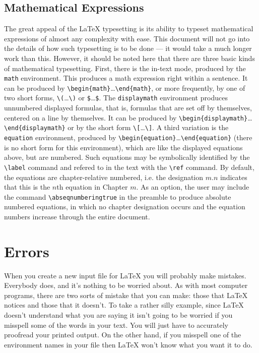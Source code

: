 \section{Mathematical Expressions}
The great appeal of the \LaTeX{} typesetting is its ability to
typeset mathematical expressions of almost any complexity with
ease.  This document will not go into the details of how such
typesetting is to be done --- it would take a much longer work
than this.  However, it should be noted here that there are
three basic kinds of mathematical typesetting.
First, there is the in-text mode, produced by the \verb+math+
environment.  This produces a math expression right within a
sentence.  It can be produced by
\verb+\begin{math}+\ldots\verb+\end{math}+, or more frequently,
by one of two short forms, \verb+\(+\ldots\verb+\)+ or
\verb+$+\ldots\verb+$+.
The \verb+displaymath+ environment produces unnumbered displayed
formulas, that is, formulas that are set off by themselves,
centered on a line by themselves.  It can be produced by
\verb+\begin{displaymath}+\ldots\verb+\end{displaymath}+ or by the
short form \verb+\[+\ldots\verb+\]+.
A third variation is the \verb+equation+ environment, produced
by \verb+\begin{equation}+\ldots\verb+\end{equation}+ (there
is no short form for this environment), which are like the
displayed equations above, but are numbered.  Such equations
may be symbolically identified by the \verb+\label+ command
and refered to in the text with the \verb+\ref+ command.
By default, the equations are chapter-relative numbered, i.e.
the designation $m.n$ indicates that this is the $n$th equation
in Chapter $m$.  As an option, the user may include the
command \verb+\abseqnumberingtrue+ in the preamble to produce
absolute numbered equations, in which no chapter designation
occurs and the equation numbers increase through the entire document.
 
\chapter{Errors}
When you create a new input file for \LaTeX{} you will probably make
mistakes.
Everybody does, and it's nothing to be worried about.
As with most computer programs, there are two sorts of mistake that
you can make: those that \LaTeX{} notices and those that it doesn't.
To take a rather silly example, since \LaTeX{} doesn't understand
what you are saying it isn't going to be worried if
you misspell some of the words in your text.
You will just have to accurately proofread your printed output.
On the other hand, if you misspell one of the environment names in
your file then \LaTeX{} won't know what you want it to do.
 
